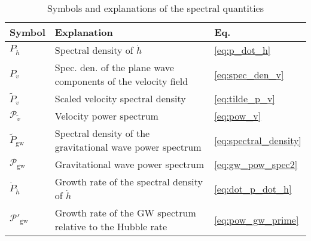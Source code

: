 \begin{table}[ht]
\caption{Symbols and explanations of the spectral quantities}
\begin{tabular}{l|l|l}
Symbol & Explanation & Eq.\\
\hline
$P_{\dot{h}}$ & Spectral density of $\dot{h}$ & \eqref{eq:p_dot_h} \\
$P_v$ & Spec. den. of the plane wave components of the velocity field & \eqref{eq:spec_den_v} \\
$\tilde{P}_v$ & Scaled velocity spectral density & \eqref{eq:tilde_p_v} \\
$\mathcal{P}_{\tilde{v}}$ & Velocity power spectrum & \eqref{eq:pow_v} \\
$\tilde{P}_\text{gw}$ & Spectral density of the gravitational wave power spectrum & \eqref{eq:spectral_density} \\
$\mathcal{P}_\text{gw}$ & Gravitational wave power spectrum & \eqref{eq:gw_pow_spec2} \\
$\dot{P}_{\dot{h}}$ & Growth rate of the spectral density of $\dot{h}$ & \eqref{eq:dot_p_dot_h} \\
$\mathcal{P}'_{\text{gw}}$ & Growth rate of the GW spectrum relative to the Hubble rate & \eqref{eq:pow_gw_prime}
\end{tabular}
\label{table:symbols}
\end{table}

